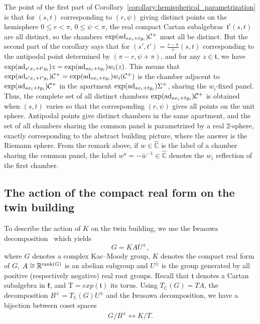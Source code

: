 \documentclass[pdftex]{sigma}
\numberwithin{equation}{section}
\def\C{{\mathbb C}}
\def\cC{\mathcal C}
\def\k{\mathfrak{k}}
\def\ft{\mathfrak{t}}
\begin{document}
The point of the first part of Corollary~\ref{corollary:hemispherical_parametrization} is that for $(s,t)$ corresponding to $(r,\psi)$ giving distinct points on the hemisphere $0\leq r < \pi$, $0\leq\psi<\pi$, the real compact Cartan subalgebras~$\ft^i(s,t)$ are all distinct, so the chambers $\exp( {\rm ad}_{sx_i+ty_i}) \cC^+$ must all be distinct. But the second part of the corollary says that for $(s',t') = \frac{r-\pi}{r}(s,t)$ corresponding to the antipodal point determined by $(\pi-r,\psi+\pi)$,
and for any $z\in\ft$, we have $\exp( {\rm ad}_{s'x_i+t'y_i}) z = \exp( {\rm ad}_{sx_i+ty_i}) w_i(z)$. This means that $\exp( {\rm ad}_{s'x_i+t'y_i}) \cC^+ = \exp( {\rm ad}_{sx_i+ty_i}) w_i(\cC^+)$ is the chamber adjacent to $\exp( {\rm ad}_{sx_i+ty_i}) \cC^+$ in the apartment $\exp( {\rm ad}_{sx_i+ty_i}) \Sigma^+$, sharing the $w_i$-fixed panel. Thus, the complete set of all distinct
chambers $\exp( {\rm ad}_{sx_i+ty_i}) \cC^+$ is obtained when $(s,t)$ varies so that the corresponding $(r,\psi)$ gives all points on the unit sphere. Antipodal points give distinct chambers in the same apartment, and the set of all chambers sharing the common panel is parametrized by a real 2-sphere, exactly corresponding to the abstract building picture, where the answer is the Riemann sphere. From the remark above, if $w\in\hat\C$ is the label of a chamber sharing the common panel, the
label $w^a = -{\bar w}^{-1} \in\hat\C$ denotes the $w_i$ reflection of the first chamber.

\subsection{The action of the compact real form on the twin building}\label{subsection:action_of_compact_real_form}
To describe the action of $K$ on the twin building, we use the Iwasawa decomposition~\cite{deMedtsGramlichHorn09} which yields
\[G=KAU^{\pm},\]
where $G$ denotes a complex Kac--Moody group, $K$ denotes the compact real form of $G$, $A\cong \mathbb{R}^{{\rm rank}(G)}$ is an abelian subgroup and $U^{\pm}$ is the group generated by all positive (respectively negative) real root groups. Recall that $\ft$ denotes
a Cartan subalgebra in $\k$, and T$=exp(\ft)$ its torus. Using $T_\C(G) = TA$, the decomposition $B^{\pm}=T_\C(G) U^{\pm}$ and the Iwasawa decomposition, we have a bijection between coset spaces
 \begin{gather}\label{equation:GB=KT}
 G/B^{\pm} \leftrightarrow K/T.
 \end{gather}
\end{document}
